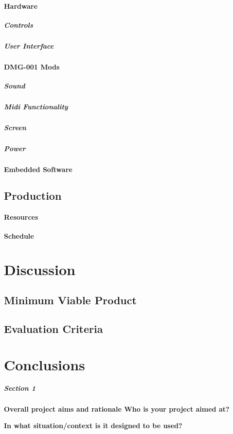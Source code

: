 \documentclass[]{article}
\begin{document}
        \paragraph{Hardware}
            \subparagraph{Controls}
            \subparagraph{User Interface}
        \paragraph{DMG-001 Mods}
            \subparagraph{Sound}
            \subparagraph{Midi Functionality}
            \subparagraph{Screen}
            \subparagraph{Power}
        \paragraph{Embedded Software}
    \subsection{Production}
        \paragraph{Resources}
        \paragraph{Schedule}

\section{Discussion}
    \subsection{Minimum Viable Product}
    \subsection{Evaluation Criteria}

\section{Conclusions}







\subparagraph[]{Section 1}
    \textbf{Overall project aims and rationale Who is your project aimed at?}

    \textbf{In what situation/context is it designed to be used?}
    
\end{document}
